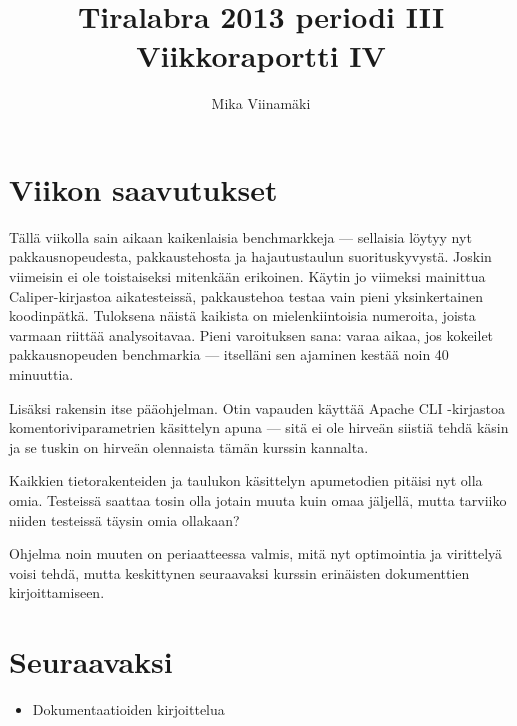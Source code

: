 \documentclass{article}
\begin{document}
\title{Tiralabra 2013 periodi III \\ Viikkoraportti IV}
\author{Mika Viinamäki}
\maketitle

\section{Viikon saavutukset}

Tällä viikolla sain aikaan kaikenlaisia benchmarkkeja --- sellaisia löytyy nyt pakkausnopeudesta, pakkaustehosta ja hajautustaulun suorituskyvystä. Joskin viimeisin ei ole toistaiseksi mitenkään erikoinen. Käytin jo viimeksi mainittua Caliper-kirjastoa aikatesteissä, pakkaustehoa testaa vain pieni yksinkertainen koodinpätkä. Tuloksena näistä kaikista on mielenkiintoisia numeroita, joista varmaan riittää analysoitavaa. Pieni varoituksen sana: varaa aikaa, jos kokeilet pakkausnopeuden benchmarkia --- itselläni sen ajaminen kestää noin 40 minuuttia.

Lisäksi rakensin itse pääohjelman. Otin vapauden käyttää Apache CLI -kirjastoa komentoriviparametrien käsittelyn apuna --- sitä ei ole hirveän siistiä tehdä käsin ja se tuskin on hirveän olennaista tämän kurssin kannalta.

Kaikkien tietorakenteiden ja taulukon käsittelyn apumetodien pitäisi nyt olla omia. Testeissä saattaa tosin olla jotain muuta kuin omaa jäljellä, mutta tarviiko niiden testeissä täysin omia ollakaan?

Ohjelma noin muuten on periaatteessa valmis, mitä nyt optimointia ja virittelyä voisi tehdä, mutta keskittynen seuraavaksi kurssin erinäisten dokumenttien kirjoittamiseen.

\section{Seuraavaksi}

\begin{itemize}
    \item Dokumentaatioiden kirjoittelua
\end{itemize}
\end{document}
